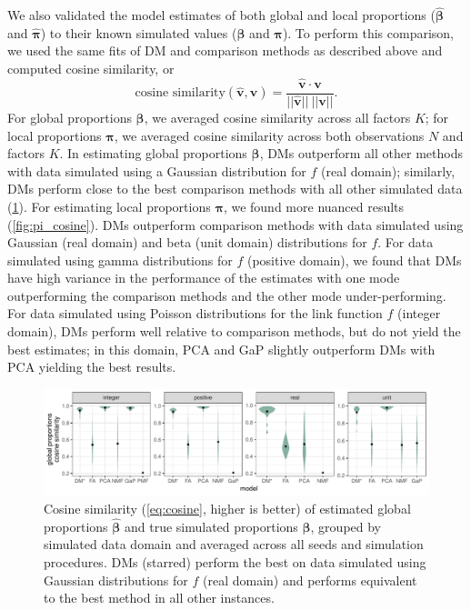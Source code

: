 \documentclass[twoside,11pt]{article}
\begin{document}
We also validated the model estimates of both global and local proportions ($\hat{\boldsymbol{\beta}}$ and $\hat{\boldsymbol{\pi}}$) to their known simulated values ($\boldsymbol{\beta}$ and $\boldsymbol{\pi}$).  To perform this comparison, we used the same fits of DM and comparison methods as described above and computed cosine similarity, or 
\begin{equation}
\mbox{cosine similarity}(\hat{\boldsymbol{v}}, \boldsymbol{v}) = \frac{\hat{\boldsymbol{v}} \cdot \boldsymbol{v} }{\vert\vert \hat{\boldsymbol{v}} \vert\vert~\vert\vert \boldsymbol{v} \vert\vert}.
\label{eq:cosine}
\end{equation}
For global proportions $\boldsymbol{\beta}$, we averaged cosine similarity across all factors $K$; for local proportions $\boldsymbol{\pi}$, we averaged cosine similarity across both observations $N$ and factors $K$.
In estimating global proportions $\boldsymbol{\beta}$, DMs  outperform all other methods with data simulated using a Gaussian distribution for $f$ (real domain); similarly, DMs perform close to the best comparison methods with all other simulated data (\cref{fig:beta_cosine}).
For estimating local proportions $\boldsymbol{\pi}$, we found more nuanced results (\cref{fig:pi_cosine}).  DMs outperform comparison methods with data simulated using Gaussian (real domain) and beta (unit domain) distributions for $f$.  For data simulated using gamma distributions for $f$ (positive domain), we found that DMs have high variance in the performance of the estimates with one mode outperforming the comparison methods and the other mode under-performing.  For data simulated using Poisson distributions for the link function $f$ (integer domain), DMs perform well relative to comparison methods, but do not yield the best estimates; in this domain, PCA and GaP slightly outperform DMs with PCA yielding the best results.


\begin{figure}
\centering
\includegraphics[width=\textwidth]{beta_cosine.pdf}
\caption{Cosine similarity (\cref{eq:cosine}, higher is better) of estimated global proportions $\hat{\boldsymbol{\beta}}$ and true simulated proportions $\boldsymbol{\beta}$, grouped by simulated data domain and averaged across all seeds and simulation procedures. DMs (starred) perform the best on data simulated using Gaussian distributions for $f$ (real domain) and performs equivalent to the best method in all other instances.}
\label{fig:beta_cosine}
\end{figure}
\end{document}
